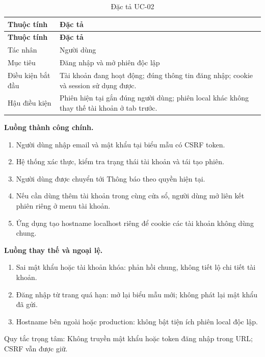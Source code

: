 {\small\setlength{\tabcolsep}{3pt}\renewcommand{\arraystretch}{1.12}
\begin{longtable}{@{}L{\textwidth-1.32pt\relax} L{\textwidth-4.68pt\relax}@{}}
\caption{Đặc tả UC-02}\\
\toprule
\textbf{Thuộc tính} & \textbf{Đặc tả}\\\midrule
\endfirsthead
\toprule
\textbf{Thuộc tính} & \textbf{Đặc tả}\\\midrule
\endhead
\bottomrule\endlastfoot
Tác nhân & Người dùng\\[3pt]
Mục tiêu & Đăng nhập và mở phiên độc lập\\[3pt]
Điều kiện bắt đầu & Tài khoản đang hoạt động; đúng thông tin đăng nhập; cookie và session sử dụng được.\allowbreak{}\\[3pt]
Hậu điều kiện & Phiên hiện tại gắn đúng người dùng; phiên local khác không thay thế tài khoản ở tab trước.\allowbreak{}\\[3pt]
\end{longtable}}
\noindent\textbf{Luồng thành công chính.}
\begin{enumerate}
\item Người dùng nhập email và mật khẩu tại biểu mẫu có CSRF token.\allowbreak{}
\item Hệ thống xác thực, kiểm tra trạng thái tài khoản và tái tạo phiên.\allowbreak{}
\item Người dùng được chuyển tới Thông báo theo quyền hiện tại.\allowbreak{}
\item Nếu cần dùng thêm tài khoản trong cùng cửa sổ, người dùng mở liên kết phiên riêng ở menu tài khoản.\allowbreak{}
\item Ứng dụng tạo hostname localhost riêng để cookie các tài khoản không dùng chung.\allowbreak{}
\end{enumerate}
\noindent\textbf{Luồng thay thế và ngoại lệ.}
\begin{enumerate}
\item Sai mật khẩu hoặc tài khoản khóa:\allowbreak{} phản hồi chung, không tiết lộ chi tiết tài khoản.\allowbreak{}
\item Đăng nhập từ trang quá hạn:\allowbreak{} mở lại biểu mẫu mới; không phát lại mật khẩu đã gửi.\allowbreak{}
\item Hostname bên ngoài hoặc production:\allowbreak{} không bật tiện ích phiên local độc lập.\allowbreak{}
\end{enumerate}
Quy tắc trọng tâm:\allowbreak{} Không truyền mật khẩu hoặc token đăng nhập trong URL; CSRF vẫn được giữ.\allowbreak{}

